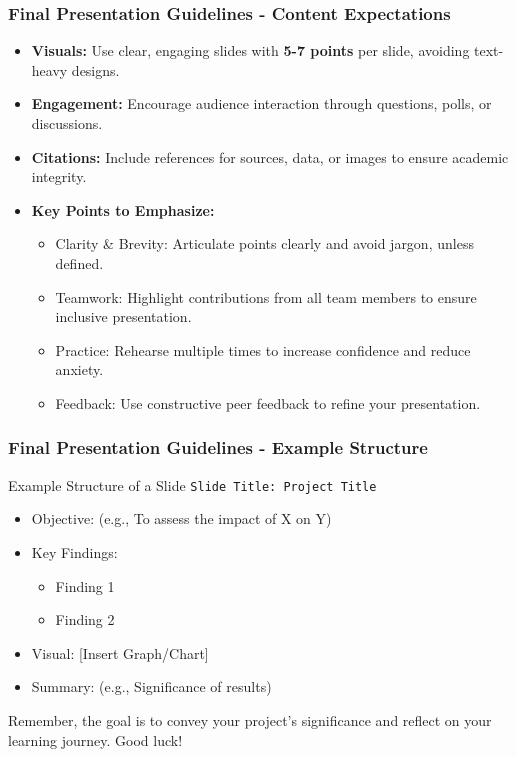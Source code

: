 \documentclass[aspectratio=169]{beamer}
\begin{document}
\begin{frame}[fragile]
    \frametitle{Final Presentation Guidelines - Content Expectations}
    \begin{itemize}
        \item \textbf{Visuals:} Use clear, engaging slides with \textbf{5-7 points} per slide, avoiding text-heavy designs.
        \item \textbf{Engagement:} Encourage audience interaction through questions, polls, or discussions.
        \item \textbf{Citations:} Include references for sources, data, or images to ensure academic integrity.
        
        \item \textbf{Key Points to Emphasize:}
        \begin{itemize}
            \item Clarity \& Brevity: Articulate points clearly and avoid jargon, unless defined.
            \item Teamwork: Highlight contributions from all team members to ensure inclusive presentation.
            \item Practice: Rehearse multiple times to increase confidence and reduce anxiety.
            \item Feedback: Use constructive peer feedback to refine your presentation.
        \end{itemize}
    \end{itemize}
\end{frame}

\begin{frame}[fragile]
    \frametitle{Final Presentation Guidelines - Example Structure}
    \begin{block}{Example Structure of a Slide}
        \texttt{Slide Title: Project Title}
        \begin{itemize}
            \item Objective: (e.g., To assess the impact of X on Y)
            \item Key Findings: 
            \begin{itemize}
                \item Finding 1
                \item Finding 2
            \end{itemize}
            \item Visual: [Insert Graph/Chart]
            \item Summary: (e.g., Significance of results)
        \end{itemize}
    \end{block}
    Remember, the goal is to convey your project’s significance and reflect on your learning journey. Good luck!
\end{frame}
\end{document}
